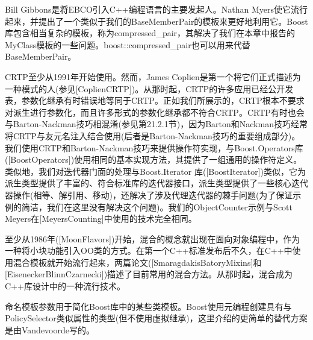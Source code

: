 Bill Gibbons是将EBCO引入C++编程语言的主要发起人。Nathan Myers使它流行起来，并提出了一个类似于我们的BaseMemberPair的模板来更好地利用它。Boost库包含相当复杂的模板，称为compressed\_pair，其解决了我们在本章中报告的MyClass模板的一些问题。boost::compressed\_pair也可以用来代替BaseMemberPair。

CRTP至少从1991年开始使用。然而，James Coplien是第一个将它们正式描述为一种模式的人(参见[CoplienCRTP])。从那时起，CRTP的许多应用已经公开发表，参数化继承有时错误地等同于CRTP。正如我们所展示的，CRTP根本不要求对派生进行参数化，而且许多形式的参数化继承都不符合CRTP。CRTP有时也会与Barton-Nackman技巧相混淆(参见第21.2.1节)，因为Barton和Nackman技巧经常将CRTP与友元名注入结合使用(后者是Barton-Nackman技巧的重要组成部分)。我们使用CRTP和Barton-Nackman技巧来提供操作符实现，与Boost.Operators库([BoostOperators])使用相同的基本实现方法，其提供了一组通用的操作符定义。类似地，我们对迭代器门面的处理与Boost.Iterator 库([BoostIterator])类似，它为派生类型提供了丰富的、符合标准库的迭代器接口，派生类型提供了一些核心迭代器操作(相等、解引用、移动)，还解决了涉及代理迭代器的棘手问题(为了保证示例的简洁，我们在这里没有解决这个问题)。我们的ObjectCounter示例与Scott Meyers在[MeyersCounting]中使用的技术完全相同。

至少从1986年([MoonFlavors])开始，混合的概念就出现在面向对象编程中，作为一种将小块功能引入OO类的方式。在第一个C++标准发布后不久，在C++中使用混合模板就开始流行起来，两篇论文([SmaragdakisBatoryMixins]和[EiseneckerBlinnCzarnecki])描述了目前常用的混合方法。从那时起，混合成为C++库设计中的一种流行技术。

命名模板参数用于简化Boost库中的某些类模板。Boost使用元编程创建具有与PolicySelector类似属性的类型(但不使用虚拟继承)，这里介绍的更简单的替代方案是由Vandevoorde写的。